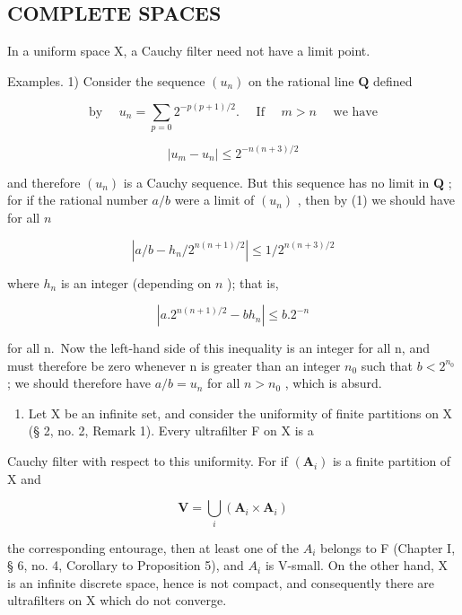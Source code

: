 \subsection{COMPLETE SPACES}

In a uniform space X, a Cauchy filter need not have a limit point.

Examples. 1) Consider the sequence \((u_{n})\) on the rational line \(\mathbf{Q}\) defined

\[
\text { by } \quad u _ {n} = \sum_ {p = 0} 2 ^ {- p (p + 1) / 2}. \quad \text { If } \quad m > n \quad \text { we   have }\tag{1}
\]

\[
\left| u _ {m} - u _ {n} \right| \leqslant 2 ^ {- n (n + 3) / 2}
\]

and therefore \((u_{n})\) is a Cauchy sequence. But this sequence has no limit in \(\mathbf{Q}\) ; for if the rational number \(a / b\) were a limit of \((u_{n})\) , then by (1) we should have for all \(n\)

\[
\left| a / b - h _ {n} / 2 ^ {n (n + 1) / 2} \right| \leqslant 1 / 2 ^ {n (n + 3) / 2}
\]

where \(h_n\) is an integer (depending on \(n\) ); that is,

\[
\left| a. 2 ^ {n (n + 1) / 2} - b h _ {n} \right| \leqslant b. 2 ^ {- n}
\]

for all n.~Now the left-hand side of this inequality is an integer for all n, and must therefore be zero whenever n is greater than an integer \(n_{0}\) such that \(b < 2^{n_{0}}\) ; we should therefore have \(a/b = u_{n}\) for all \(n > n_{0}\) , which is absurd.

\begin{enumerate}
\def\labelenumi{\arabic{enumi})}
\setcounter{enumi}{1}
\tightlist
\item
  Let X be an infinite set, and consider the uniformity of finite partitions on X (§ 2, no. 2, Remark 1). Every ultrafilter F on X is a
\end{enumerate}

Cauchy filter with respect to this uniformity. For if \((\mathbf{A}_{i})\) is a finite partition of X and

\[
\mathbf {V} = \bigcup_ {i} (\mathbf {A} _ {i} \times \mathbf {A} _ {i})
\]

the corresponding entourage, then at least one of the \(A_{i}\) belongs to F (Chapter I, § 6, no. 4, Corollary to Proposition 5), and \(A_{i}\) is V-small. On the other hand, X is an infinite discrete space, hence is not compact, and consequently there are ultrafilters on X which do not converge.

